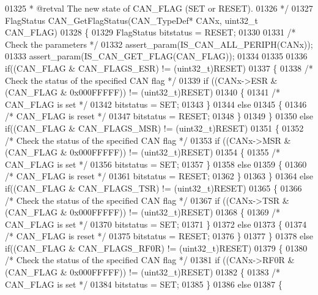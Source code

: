 \begin{DoxyCode}
01325 \textcolor{comment}{  * @retval The new state of CAN\_FLAG (SET or RESET).}
01326 \textcolor{comment}{  */}
01327 FlagStatus CAN_GetFlagStatus(CAN\_TypeDef* CANx, uint32\_t CAN\_FLAG)
01328 \{
01329   FlagStatus bitstatus = RESET;
01330 
01331   \textcolor{comment}{/* Check the parameters */}
01332   assert_param(IS\_CAN\_ALL\_PERIPH(CANx));
01333   assert_param(IS\_CAN\_GET\_FLAG(CAN\_FLAG));
01334 
01335 
01336   \textcolor{keywordflow}{if}((CAN\_FLAG & CAN_FLAGS_ESR) != (uint32\_t)RESET)
01337   \{
01338     \textcolor{comment}{/* Check the status of the specified CAN flag */}
01339     \textcolor{keywordflow}{if} ((CANx->ESR & (CAN\_FLAG & 0x000FFFFF)) != (uint32\_t)RESET)
01340     \{
01341       \textcolor{comment}{/* CAN\_FLAG is set */}
01342       bitstatus = SET;
01343     \}
01344     \textcolor{keywordflow}{else}
01345     \{
01346       \textcolor{comment}{/* CAN\_FLAG is reset */}
01347       bitstatus = RESET;
01348     \}
01349   \}
01350   \textcolor{keywordflow}{else} \textcolor{keywordflow}{if}((CAN\_FLAG & CAN_FLAGS_MSR) != (uint32\_t)RESET)
01351   \{
01352     \textcolor{comment}{/* Check the status of the specified CAN flag */}
01353     \textcolor{keywordflow}{if} ((CANx->MSR & (CAN\_FLAG & 0x000FFFFF)) != (uint32\_t)RESET)
01354     \{
01355       \textcolor{comment}{/* CAN\_FLAG is set */}
01356       bitstatus = SET;
01357     \}
01358     \textcolor{keywordflow}{else}
01359     \{
01360       \textcolor{comment}{/* CAN\_FLAG is reset */}
01361       bitstatus = RESET;
01362     \}
01363   \}
01364   \textcolor{keywordflow}{else} \textcolor{keywordflow}{if}((CAN\_FLAG & CAN_FLAGS_TSR) != (uint32\_t)RESET)
01365   \{
01366     \textcolor{comment}{/* Check the status of the specified CAN flag */}
01367     \textcolor{keywordflow}{if} ((CANx->TSR & (CAN\_FLAG & 0x000FFFFF)) != (uint32\_t)RESET)
01368     \{
01369       \textcolor{comment}{/* CAN\_FLAG is set */}
01370       bitstatus = SET;
01371     \}
01372     \textcolor{keywordflow}{else}
01373     \{
01374       \textcolor{comment}{/* CAN\_FLAG is reset */}
01375       bitstatus = RESET;
01376     \}
01377   \}
01378   \textcolor{keywordflow}{else} \textcolor{keywordflow}{if}((CAN\_FLAG & CAN_FLAGS_RF0R) != (uint32\_t)RESET)
01379   \{
01380     \textcolor{comment}{/* Check the status of the specified CAN flag */}
01381     \textcolor{keywordflow}{if} ((CANx->RF0R & (CAN\_FLAG & 0x000FFFFF)) != (uint32\_t)RESET)
01382     \{
01383       \textcolor{comment}{/* CAN\_FLAG is set */}
01384       bitstatus = SET;
01385     \}
01386     \textcolor{keywordflow}{else}
01387     \{

\end{DoxyCode}
